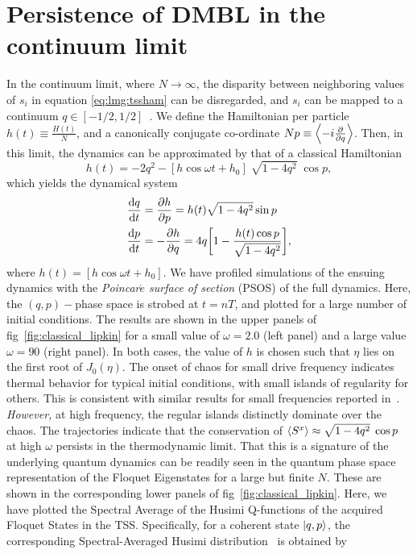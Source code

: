 \documentclass[%
reprint,
superscriptaddress,
amsmath,amssymb,
aps,
prb,
showkeys,
]{revtex4-2}
\begin{document}
\section{\label{sec:level4}Persistence of DMBL in the continuum limit}
In the continuum limit, where $N\rightarrow\infty$, the disparity between neighboring values of $s_i$ in equation \ref{eq:lmg:tssham} can be disregarded, and $s_i$ can be mapped to a continuum $q\in \left[-1/2, 1/2\right]$~\cite{mori_prethermalization_2019}. We define	the Hamiltonian per particle $h(t)\equiv \frac{H(t)}{N}$, and a canonically conjugate co-ordinate $Np\equiv \expval{-i\pdv{}{q}}$. Then, in this limit, the dynamics can be approximated by that of a classical Hamiltonian~\cite{sciolla_quantum_2010}
\begin{equation}
h(t) = -2 q^2 - \left[h\cos{\omega t} + h_0\right]\;\sqrt{1-4q^2}\;\cos{p},
\label{eq:class:ham}
\end{equation}
which yields the dynamical system 
\begin{align}
 \dv{q}{t} &= \pdv{h}{p} = h(t)\sqrt{1-4q^2}\sin{p}\nonumber \\
 \dv{p}{t} &= -\pdv{h}{q} = 4q\bigg[1-\frac{h(t)\cos{p}}{\sqrt{1-4q^2}}\bigg],
	\label{eq:class:poinc}
\end{align}
where $h(t) = \left[h\cos{\omega t} + h_0\right]$. We have profiled simulations of the ensuing dynamics with the \emph{Poincar$\acute{e}$ surface of section} (PSOS) of the full dynamics. Here, the $\left(q,p\right)-$phase space is strobed at $t=nT$, and plotted for a large number of initial conditions. The results are shown in the upper panels of fig~\ref{fig:classical_lipkin} for a small value of $\omega=2.0$ (left panel) and a large value $\omega=90$ (right panel). In both cases, the value of $h$ is chosen such that $\eta$ lies on the first root of $J_0(\eta)$. The onset of chaos for small drive frequency indicates thermal behavior for typical initial conditions, with small islands of regularity for others. This is consistent with similar results for small frequencies reported in~\cite{russomanno_thermalization_2015, Kidd2019}. \emph{However,} at high frequency, the regular islands distinctly dominate over the chaos. The trajectories indicate that the conservation of $\expval{S^x}\approx \sqrt{1-4q^2}\;\cos{p}$~\cite{mori_prethermalization_2019} at high $\omega$ persists in the thermodynamic limit.
That this is a signature of the underlying quantum dynamics can be readily seen in the quantum phase space representation of the Floquet Eigenstates for a large but finite $N$. These are shown in the corresponding lower panels of fig~\ref{fig:classical_lipkin}. Here, we have plotted the Spectral Average of the Husimi Q-functions of the acquired Floquet States in the TSS. Specifically, for a coherent state $\ket{q,p}$, the corresponding Spectral-Averaged Husimi distribution~\cite{husimi} is obtained by 
\end{document}

